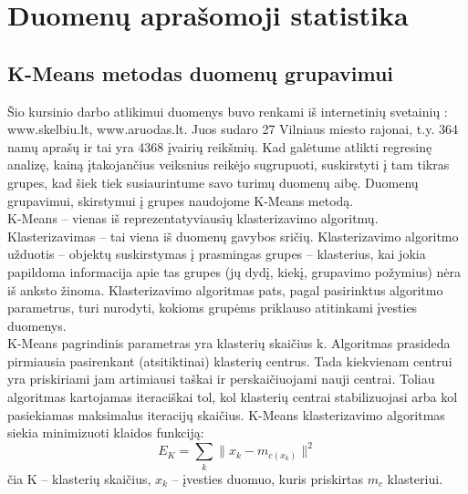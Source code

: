 \documentclass[a4paper]{article}
\begin{document}
\section{Duomenų aprašomoji statistika}
\subsection{K-Means metodas duomenų grupavimui}
\hspace*{0,52cm}Šio kursinio darbo atlikimui duomenys buvo renkami iš internetinių svetainių : www.skelbiu.lt, www.aruodas.lt. Juos sudaro 27 Vilniaus miesto rajonai, t.y. 364 namų aprašų ir tai yra 4368 įvairių reikšmių. Kad galėtume atlikti regresinę analizę, kainą įtakojančius veiksnius reikėjo sugrupuoti, suskirstyti į tam tikras grupes, kad šiek tiek susiaurintume savo turimų duomenų aibę. Duomenų grupavimui, skirstymui į grupes naudojome K-Means metodą.\\
\hspace*{0,52cm}K-Means -- vienas iš reprezentatyviausių klasterizavimo algoritmų. Klasterizavimas -- tai viena iš duomenų gavybos sričių. Klasterizavimo algoritmo užduotis -- objektų suskirstymas į prasmingas grupes -- klasterius, kai jokia papildoma informacija apie tas grupes (jų dydį, kiekį, grupavimo požymius) nėra iš anksto žinoma. Klasterizavimo algoritmas pats, pagal pasirinktus algoritmo parametrus, turi nurodyti, kokioms grupėms priklauso atitinkami įvesties duomenys.\\
\hspace*{0,52cm}K-Means pagrindinis parametras yra klasterių skaičius k. Algoritmas prasideda pirmiausia pasirenkant (atsitiktinai) klasterių centrus. Tada kiekvienam centrui yra priskiriami jam artimiausi taškai ir perskaičiuojami nauji centrai. Toliau algoritmas kartojamas iteraciškai tol, kol klasterių centrai stabilizuojasi arba kol pasiekiamas maksimalus iteracijų skaičius. K-Means klasterizavimo algoritmas siekia minimizuoti klaidos funkciją:\\
\begin{equation}
E_K=\sum_{k}\parallel x_k-m_{c(x_k)}\parallel ^{2} 
\end{equation}
čia K -- klasterių skaičius, $x_k$ -- įvesties duomuo, kuris priskirtas $m_c$ klasteriui.
\end{document}
